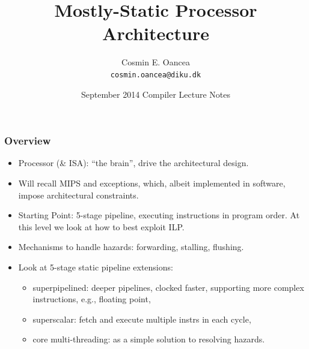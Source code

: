 \documentclass{beamer}
\title[Processor]{Mostly-Static Processor Architecture}
\author[C.~Oancea]{Cosmin E. Oancea\\{\tt cosmin.oancea@diku.dk}}
\institute{Department of Computer Science (DIKU)\\University of Copenhagen}
\date[Sept 2014]{September 2014 Compiler Lecture Notes}
\begin{document}
\titleslide






\begin{frame}[fragile,t]
\frametitle{Overview}

\begin{itemize}
    \item Processor (\& ISA): ``the brain'', drive the architectural design.\smallskip
 
    \item Will recall MIPS and exceptions, which, albeit implemented in software, 
            impose architectural constraints.\smallskip
    \item Starting Point: 5-stage pipeline, executing instructions in 
            program order. At this level we look at how to best exploit ILP.\smallskip
    \item Mechanisms to handle hazards: forwarding, stalling, flushing.\smallskip
    \item Look at 5-stage static pipeline extensions:
        \begin{itemize}
            \item superpipelined: deeper pipelines, clocked faster, supporting
                    more complex instructions, e.g., floating point,
            \item superscalar: fetch and execute multiple instrs in each cycle,
            \item core multi-threading: as a simple solution to resolving hazards.\smallskip
        \end  {itemize}
\end  {itemize}

\end{frame}
\end{document}
